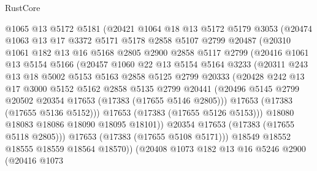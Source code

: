 \begin{lexlean}{RustCore}
\begin{coremodule}
            @1065
            @13
            @5172
            @5181
            (@20421
              @1064
              @18
              @13
              @5172
              @5179
              @3053
              (@20474
                @1063
                @13
                @17
                @3372
                @5171
                @5178
                @2858
                @5107
                @2799
                @20487
                (@20310
                  @1061
                  @182
                  @13
                  @16
                  @5168
                  @2805
                  @2900
                  @2858
                  @5117
                  @2799
                  (@20416
                    @1061
                    @13
                    @5154
                    @5166
                    (@20457
                      @1060
                      @22
                      @13
                      @5154
                      @5164
                      @3233
                      (@20311
                        @243
                        @13
                        @18
                        @5002
                        @5153
                        @5163
                        @2858
                        @5125
                        @2799
                        @20333
                        (@20428
                          @242
                          @13
                          @17
                          @3000
                          @5152
                          @5162
                          @2858
                          @5135
                          @2799
                          @20441
                          (@20496 @5145 @2799 @20502 @20354 @17653 (@17383 (@17655 @5146 @2805)))
                          @17653
                          (@17383 (@17655 @5136 @5152)))
                        @17653
                        (@17383 (@17655 @5126 @5153)))
                      @18080
                      @18083
                      @18086
                      @18090
                      @18095
                      @18101))
                  @20354
                  @17653
                  (@17383 (@17655 @5118 @2805)))
                @17653
                (@17383 (@17655 @5108 @5171)))
              @18549
              @18552
              @18555
              @18559
              @18564
              @18570))
          (@20408
            @1073
            @182
            @13
            @16
            @5246
            @2900
            (@20416
              @1073

\end{coremodule}
\end{lexlean}
